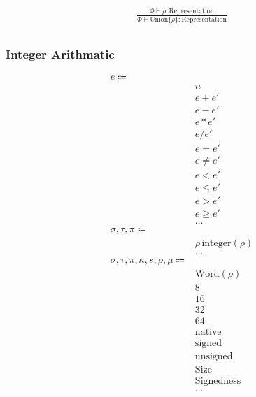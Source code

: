 \documentclass {article}
\begin{document}
\begin{gather*}
\frac
{\Phi \vdash \overline {\rho : \text{Representation}}}
{\Phi \vdash \text{Union} \{ \overline \rho \} : \text{Representation} } \\
\end{gather*}

\subsubsection{Integer Arithmatic}
\begin{align*}
e \Coloneqq & \\
& n \tag{Numeric Literal} \\
& e + e' \tag{Addition} \\
& e - e' \tag{Subtraction} \\
& e * e' \tag{Multiplication} \\
& e / e' \tag{Division} \\
& e = e' \tag {Equality} \\
& e \neq e' \tag {Inequality} \\
& e < e' \tag {Less Then} \\
& e \leq e' \tag {Less Then Equal} \\
& e > e' \tag {Greater Then} \\
& e \geq e' \tag {Greater Then Equal} \\
& \dots \\
\sigma, \tau, \pi \Coloneqq & \\
& \rho \, \text{integer}(\rho) \tag{Number} \\
& \dots \\
\sigma, \tau, \pi, \kappa, s, \rho, \mu \Coloneqq & \\
& \text{Word} (\rho) \tag{Word Representation} \\
& 8 \tag{Byte Size} \\
& 16 \tag{Short Size} \\
& 32 \tag{Int Size} \\
& 64 \tag{Long Size} \\
& \text{native} \tag{Native Size} \\
& \text{signed} \tag{Signed} \\
& \text{unsigned} \tag{Unsigned} \\
& \text{Size} \tag{Size Sort}\\
& \text{Signedness} \tag{Signedness Sort}\\
& \dots \\
\end{align*}
\end{document}
